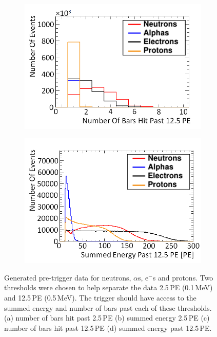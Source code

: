 \begin{figure}[!h]
\begin{subfigure}{.49\textwidth}
  \includegraphics[width=\linewidth]{Chapter4.5/Figs/preTrigNba12.5.png}
  \captionsetup{width=.9\linewidth}
  \caption{}
  \label{subFig:preTrigNba12.5}
\end{subfigure}
\begin{subfigure}{.49\textwidth}
  \centering
  \includegraphics[width=\linewidth]{Chapter4.5/Figs/preTrigSea12.5.png}
  \captionsetup{width=.9\linewidth}
  \caption{}
  \label{subFig:preTrigSea12.5}
\end{subfigure}
\caption{Generated pre-trigger data for neutrons, $\alpha$s, e$^-$s and protons. Two thresholds were chosen to help separate the data 2.5\,PE (0.1\,MeV) and 12.5\,PE (0.5\,MeV). The trigger should have access to the summed energy and number of bars past each of these thresholds. (a) number of bars hit past 2.5\,PE (b) summed energy 2.5\,PE (c) number of bars hit past 12.5\,PE (d) summed energy past 12.5\,PE.}
\label{fig:preTriggerData}
\end{figure}

